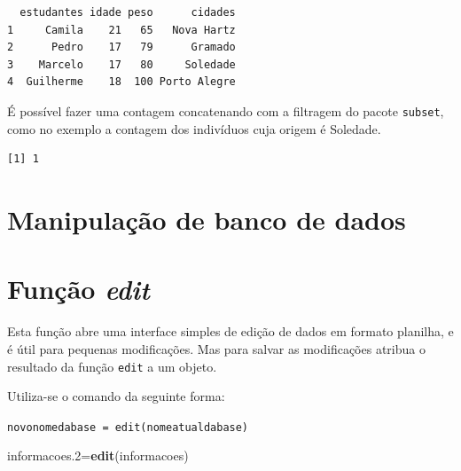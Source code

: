 \documentclass[12pt,brazil,oneside]{book}
\newenvironment{Shaded}{\begin{snugshade}}{\end{snugshade}}
\newcommand{\FloatTok}[1]{\textcolor[rgb]{0.00,0.00,0.81}{#1}}
\newcommand{\KeywordTok}[1]{\textcolor[rgb]{0.13,0.29,0.53}{\textbf{#1}}}
\newcommand{\NormalTok}[1]{#1}
\newcommand{\OperatorTok}[1]{\textcolor[rgb]{0.81,0.36,0.00}{\textbf{#1}}}
\newcommand{\StringTok}[1]{\textcolor[rgb]{0.31,0.60,0.02}{#1}}
\begin{document}
\begin{verbatim}
  estudantes idade peso      cidades
1     Camila    21   65   Nova Hartz
2      Pedro    17   79      Gramado
3    Marcelo    17   80     Soledade
4  Guilherme    18  100 Porto Alegre
\end{verbatim}

É possível fazer uma contagem concatenando com a filtragem do pacote
\texttt{subset}, como no exemplo a contagem dos indivíduos cuja origem é
Soledade.

\begin{Shaded}
\end{Shaded}

\begin{verbatim}
[1] 1
\end{verbatim}

\hypertarget{manipulacao-de-banco-de-dados}{%
\section{Manipulação de banco de
dados}\label{manipulacao-de-banco-de-dados}}

\hypertarget{funcao-edit}{%
\section{\texorpdfstring{Função
\emph{edit}}{Função edit}}\label{funcao-edit}}

Esta função abre uma interface simples de edição de dados em formato
planilha, e é útil para pequenas modificações. Mas para salvar as
modificações atribua o resultado da função \texttt{edit} a um objeto.

Utiliza-se o comando da seguinte forma:

\texttt{novonomedabase\ =\ edit(nomeatualdabase)}

\begin{Shaded}
\begin{Highlighting}[]
\NormalTok{informacoes}\FloatTok{.2}\NormalTok{=}\KeywordTok{edit}\NormalTok{(informacoes)}
\end{Highlighting}
\end{Shaded}
\end{document}
